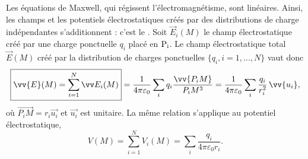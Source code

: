 \documentclass[12pt,fancy]{cours}
\begin{document}
Les équations de Maxwell, qui régissent l’électromagnétisme, sont linéaires. Ainsi, les champs et les potentiels électrostatiques créés par des distributions de charge indépendantes s’additionnent : c’est le . Soit $\Vec{E}_i(M)$ le champ électrostatique créé par une charge ponctuelle $q_i$ placé en $\rm P_i$. Le champ électrostatique total $\Vec{E}(M)$ créé par la distribution  de charges ponctuelles $\{q_i, i=1,...,N\}$ vaut donc
\begin{equation}
  \boxed{
 \vv{E}(M)=\sum_{i = 1}^N \Vec{E}_i(M)} =  \frac{1}{4\pi\varepsilon_0}\sum_iq_i \frac{\vv{P_i M} }{ P_iM^3}=  \frac{1}{4\pi\varepsilon_0}\sum_i\frac{q_i}{ r_i^2}\,\vv{u_i},
\end{equation}
où $\Vec{P_iM} = r_i \Vec{u_i}$ et $ \Vec{u_i}$ est unitaire. La même relation s'applique au potentiel électrostatique,
\begin{equation}
  \boxed{
  V(M)=\sum_{i = 1}^N V_i(M)} = \sum_i \frac{q_i}{4\pi\varepsilon_0 r_i}.
\end{equation}
\end{document}

